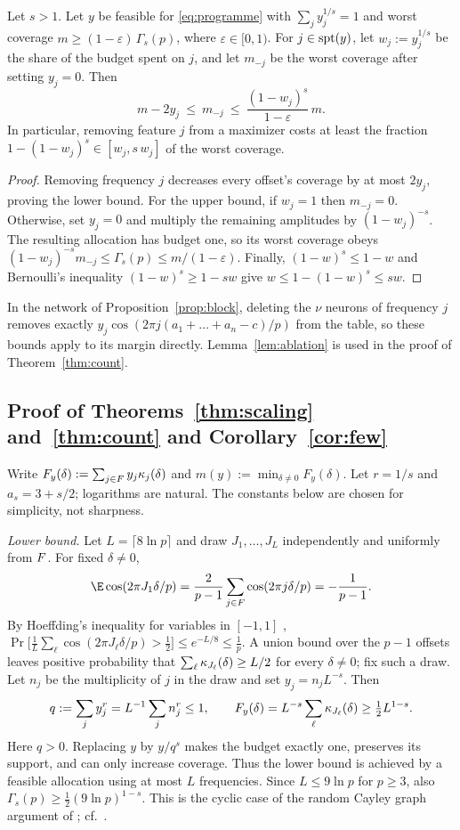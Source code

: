 \begin{lemma}\label{lem:ablation}
Let $s>1$. Let $y$ be feasible for \eqref{eq:programme} with $\sum_jy_j^{1/s}=1$ and worst coverage $m\ge(1-\varepsilon)\,\Gamma_s(p)$, where $\varepsilon\in[0,1)$. For $j\in\mathrm{spt}(y)$, let $w_j:=y_j^{1/s}$ be the share of the budget spent on $j$, and let $m_{-j}$ be the worst coverage after setting $y_j=0$. Then
\[
m-2y_j\ \le\ m_{-j}\ \le\ \frac{(1-w_j)^s}{1-\varepsilon}\,m .
\]
In particular, removing feature $j$ from a maximizer costs at least the fraction $1-(1-w_j)^s\in[w_j,s\,w_j]$ of the worst coverage.
\end{lemma}
\begin{proof}
Removing frequency $j$ decreases every offset's coverage by at most $2y_j$, proving the lower bound. For the upper bound, if $w_j=1$ then $m_{-j}=0$. Otherwise, set $y_j=0$ and multiply the remaining amplitudes by $(1-w_j)^{-s}$. The resulting allocation has budget one, so its worst coverage obeys $(1-w_j)^{-s}m_{-j}\le\Gamma_s(p)\le m/(1-\varepsilon)$. Finally, $(1-w)^s\le1-w$ and Bernoulli's inequality $(1-w)^s\ge1-sw$ give $w\le1-(1-w)^s\le sw$.
\end{proof}
In the network of Proposition~\ref{prop:block}, deleting the $\nu$ neurons of frequency $j$ removes exactly $y_j\cos(2\pi j(a_1+\dots+a_n-c)/p)$ from the table, so these bounds apply to its margin directly. Lemma~\ref{lem:ablation} is used in the proof of Theorem~\ref{thm:count}.

\subsection{Proof of Theorems~\ref{thm:scaling} and~\ref{thm:count} and Corollary~\ref{cor:few}}\label{app:scaling}

Write $F_y(\delta):=\sum_{j\in F}y_j\kappa_{j}(\delta)$ and $m(y):=\min_{\delta\neq0}F_y(\delta)$. Let $r=1/s$ and $a_s=3+s/2$; logarithms are natural. The constants below are chosen for simplicity, not sharpness.

\emph{Lower bound.} Let $L=\lceil8\ln p\rceil$ and draw $J_1,\dots,J_L$ independently and uniformly from $F$. For fixed $\delta\neq0$,
\[
\E\cos(2\pi J_1\delta/p)=\frac2{p-1}\sum_{j\in\Fp}\cos(2\pi j\delta/p)=-\frac1{p-1}.
\]
By Hoeffding's inequality for variables in $[-1,1]$ \citep[Thm.~2]{hoeffding1963probability}, $\Pr\big[\frac1L\sum_\ell\cos(2\pi J_\ell\delta/p)>\frac12\big]\le e^{-L/8}\le\frac1p$. A union bound over the $p-1$ offsets leaves positive probability that $\sum_\ell\kappa_{J_\ell}(\delta)\ge L/2$ for every $\delta\neq0$; fix such a draw.
Let $n_j$ be the multiplicity of $j$ in the draw and set $y_j=n_jL^{-s}$. Then
\[
q:=\sum_jy_j^r=L^{-1}\sum_jn_j^r\le1,
\qquad
F_y(\delta)=L^{-s}\sum_\ell\kappa_{J_\ell}(\delta)\ge\tfrac12L^{1-s}.
\]
Here $q>0$. Replacing $y$ by $y/q^s$ makes the budget exactly one, preserves its support, and can only increase coverage. Thus the lower bound is achieved by a feasible allocation using at most $L$ frequencies. Since $L\le9\ln p$ for $p\ge3$, also $\Gamma_s(p)\ge\frac12(9\ln p)^{1-s}$. This is the cyclic case of the random Cayley graph argument of \citet[Sec.~3, Thm.~2]{alon1994random}; cf.\ \citet[Thm.~4.7]{mccracken2025}.

